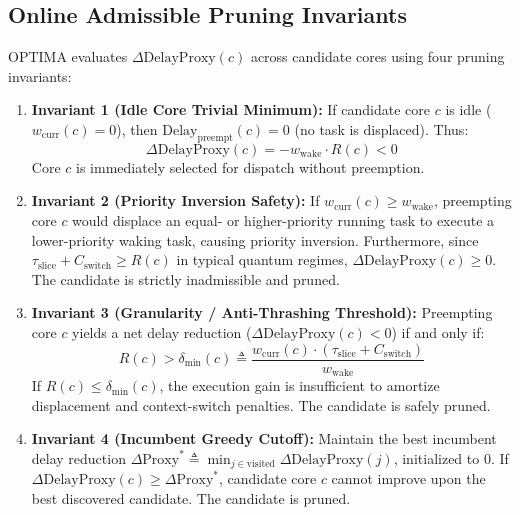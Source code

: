 \documentclass[conference]{IEEEtran}
\begin{document}
\subsection{Online Admissible Pruning Invariants}
OPTIMA evaluates $\Delta\mathrm{DelayProxy}(c)$ across candidate cores using four pruning invariants:

\begin{enumerate}
    \item \textbf{Invariant 1 (Idle Core Trivial Minimum):} If candidate core $c$ is idle ($w_{\mathrm{curr}}(c) = 0$), then $\mathrm{Delay}_{\mathrm{preempt}}(c) = 0$ (no task is displaced). Thus:
    \begin{equation}
    \Delta\mathrm{DelayProxy}(c) = -w_{\mathrm{wake}} \cdot R(c) < 0
    \end{equation}
    Core $c$ is immediately selected for dispatch without preemption.
    
    \item \textbf{Invariant 2 (Priority Inversion Safety):} If $w_{\mathrm{curr}}(c) \ge w_{\mathrm{wake}}$, preempting core $c$ would displace an equal- or higher-priority running task to execute a lower-priority waking task, causing priority inversion. Furthermore, since $\tau_{\mathrm{slice}} + C_{\mathrm{switch}} \ge R(c)$ in typical quantum regimes, $\Delta\mathrm{DelayProxy}(c) \ge 0$. The candidate is strictly inadmissible and pruned.
    
    \item \textbf{Invariant 3 (Granularity / Anti-Thrashing Threshold):} Preempting core $c$ yields a net delay reduction ($\Delta\mathrm{DelayProxy}(c) < 0$) if and only if:
    \begin{equation}
    \label{eq:thrash_threshold}
    R(c) > \delta_{\min}(c) \triangleq \frac{w_{\mathrm{curr}}(c) \cdot (\tau_{\mathrm{slice}} + C_{\mathrm{switch}})}{w_{\mathrm{wake}}}
    \end{equation}
    If $R(c) \le \delta_{\min}(c)$, the execution gain is insufficient to amortize displacement and context-switch penalties. The candidate is safely pruned.
    
    \item \textbf{Invariant 4 (Incumbent Greedy Cutoff):} Maintain the best incumbent delay reduction $\Delta\mathrm{Proxy}^* \triangleq \min_{j \in \mathrm{visited}} \Delta\mathrm{DelayProxy}(j)$, initialized to 0. If $\Delta\mathrm{DelayProxy}(c) \ge \Delta\mathrm{Proxy}^*$, candidate core $c$ cannot improve upon the best discovered candidate. The candidate is pruned.
\end{enumerate}
\end{document}
